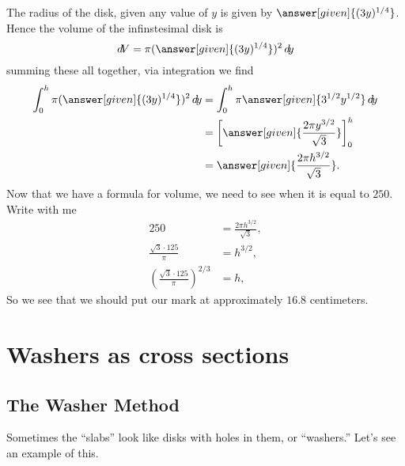 \documentclass{ximera}
\begin{document}
\begin{example}
\begin{explanation}
\begin{image}
    \end{image}
    The radius of the disk, given any value of $y$ is given by
    $\answer[given]{(3y)^{1/4}}$. Hence the volume of the
    infinstesimal disk is
    \[
    \d V = \pi (\answer[given]{(3y)^{1/4}})^2 \d y
    \]
    summing these all together, via integration we find
    \begin{align*}
      \int_0^h \pi (\answer[given]{(3y)^{1/4}})^2 \d y &= \int_0^h \pi\answer[given]{3^{1/2} y^{1/2}} \d y\\
      &= \eval{\answer[given]{\frac{2\pi y^{3/2}}{\sqrt{3}}}}_0^h\\
      &= \answer[given]{\frac{2\pi h^{3/2}}{\sqrt{3}}}.
    \end{align*}
    Now that we have a formula for volume, we need to see when it is
    equal to $250$. Write with me
    \begin{align*}
      250 &= \frac{2\pi h^{3/2}}{\sqrt{3}},\\
      \frac{\sqrt{3} \cdot 125}{\pi} &=  h^{3/2},\\
      \left(\frac{\sqrt{3} \cdot 125}{\pi}\right)^{2/3} &=  h,
    \end{align*}
    So we see that we should put our mark at approximately $16.8$
    centimeters.
  \end{explanation}
\end{example}

\section{Washers as cross sections}


\subsection{The Washer Method}

Sometimes the ``slabs'' look like disks with holes in them, or
``washers.'' Let's see an example of this.
\end{document}
